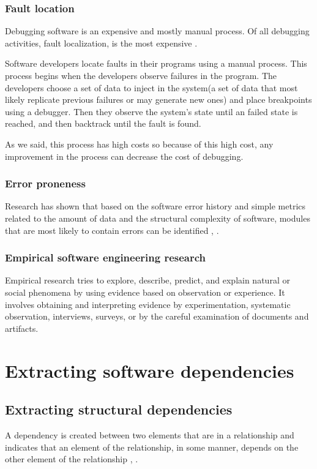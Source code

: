 \documentclass[12pt, a4paper, twoside]{report}
\begin{document}
\subsection{Fault location}
Debugging software is an expensive and mostly manual process. Of all debugging activities, fault localization, is the most expensive \cite{articleDebugging}. 

Software developers locate faults in their programs using a manual process. This process begins when the developers observe failures in the program. The developers choose a set of data to inject in the system(a set of data that most likely replicate previous failures or may generate new ones) and place breakpoints using a debugger. Then they observe the system's state until an failed state is reached, and then backtrack until the fault is found. 

As we said, this process has high costs so because of this high cost, any improvement in the process can decrease the cost of debugging.\cite{fault-localization} \cite{program-failures}


\subsection{Error proneness}
Research has shown that based on the software error history and simple metrics related to the amount of data and the structural complexity of software,
modules that are most likely to contain errors can be identified \cite{67595}, \cite{1702015}.


\subsection{Empirical software engineering research}
Empirical research tries to explore, describe, predict, and explain natural or social phenomena by using evidence based on observation or experience.
It involves obtaining and interpreting evidence by experimentation, systematic observation, interviews, surveys, or by the careful examination of documents and artifacts. \cite{inproceedingsEmpirical}



\chapter{Extracting software dependencies}
\label{extraction}


\section{Extracting structural dependencies}
\label{sec:sd_extraction}
A dependency is created between two elements that are in a relationship and indicates that an element of the relationship, in some manner, depends on the other element of the relationship \cite{Booch:2004:OAD:975416}, \cite{Cataldo2009SoftwareDW}.
\end{document}
